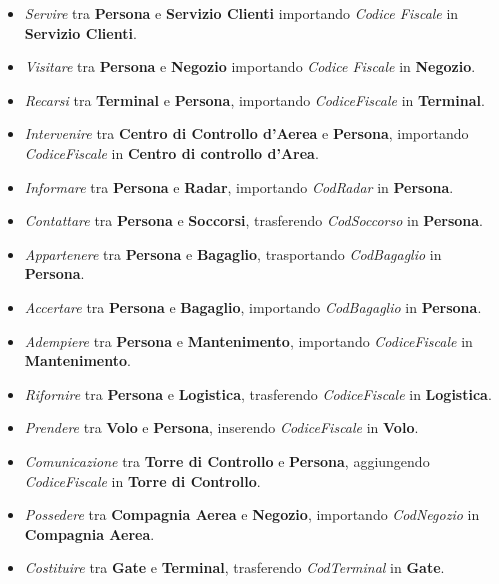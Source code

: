 \begin{itemize}
	\item \textsf{\small \emph{Servire} tra \textbf{Persona} e \textbf{Servizio Clienti} importando \emph{Codice Fiscale} in \textbf{Servizio Clienti}.}
	\item \textsf{\small \emph{Visitare} tra \textbf{Persona} e \textbf{Negozio} importando \emph{Codice Fiscale} in \textbf{Negozio}.}
	\item \textsf{\small \emph{Recarsi} tra \textbf{Terminal} e \textbf{Persona}, importando \emph{CodiceFiscale} in \textbf{Terminal}.}
	\item \textsf{\small \emph{Intervenire} tra \textbf{Centro di Controllo d'Aerea} e \textbf{Persona}, importando \emph{CodiceFiscale} in \textbf{Centro di controllo d'Area}.}
	\item \textsf{\small \emph{Informare} tra \textbf{Persona} e \textbf{Radar}, importando \emph{CodRadar} in \textbf{Persona}.}
	\item \textsf{\small \emph{Contattare} tra \textbf{Persona} e \textbf{Soccorsi}, trasferendo \emph{CodSoccorso} in \textbf{Persona}.}
	\item \textsf{\small \emph{Appartenere} tra \textbf{Persona} e \textbf{Bagaglio}, trasportando \emph{CodBagaglio} in \textbf{Persona}.}
	\item \textsf{\small \emph{Accertare} tra \textbf{Persona} e \textbf{Bagaglio}, importando \emph{CodBagaglio} in \textbf{Persona}.} %
	\item \textsf{\small \emph{Adempiere} tra \textbf{Persona} e \textbf{Mantenimento}, importando \emph{CodiceFiscale} in \textbf{Mantenimento}. }
	\item \textsf{\small \emph{Rifornire} tra \textbf{Persona} e \textbf{Logistica}, trasferendo \emph{CodiceFiscale} in \textbf{Logistica}. }
	\item \textsf{\small \emph{Prendere} tra \textbf{Volo} e \textbf{Persona}, inserendo \emph{CodiceFiscale} in \textbf{Volo}.}
	\item \textsf{\small \emph{Comunicazione} tra \textbf{Torre di Controllo} e \textbf{Persona}, aggiungendo \emph{CodiceFiscale} in \textbf{Torre di Controllo}.}
	\item \textsf{\small \emph{Possedere} tra \textbf{Compagnia Aerea} e \textbf{Negozio}, importando \emph{CodNegozio} in \textbf{Compagnia Aerea}.}
	\item \textsf{\small \emph{Costituire} tra \textbf{Gate} e \textbf{Terminal}, trasferendo \emph{CodTerminal} in \textbf{Gate}.}

\end{itemize}
